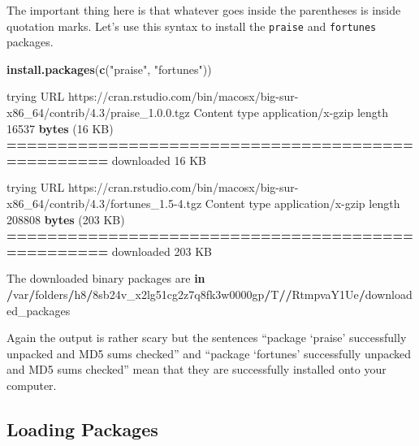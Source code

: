\documentclass[
]{book}
\newenvironment{Shaded}{\begin{snugshade}}{\end{snugshade}}
\newcommand{\ControlFlowTok}[1]{\textcolor[rgb]{0.13,0.29,0.53}{\textbf{#1}}}
\newcommand{\DecValTok}[1]{\textcolor[rgb]{0.00,0.00,0.81}{#1}}
\newcommand{\ErrorTok}[1]{\textcolor[rgb]{0.64,0.00,0.00}{\textbf{#1}}}
\newcommand{\FunctionTok}[1]{\textcolor[rgb]{0.13,0.29,0.53}{\textbf{#1}}}
\newcommand{\NormalTok}[1]{#1}
\newcommand{\SpecialCharTok}[1]{\textcolor[rgb]{0.81,0.36,0.00}{\textbf{#1}}}
\newcommand{\StringTok}[1]{\textcolor[rgb]{0.31,0.60,0.02}{#1}}
\begin{document}
The important thing here is that whatever goes inside the parentheses is inside quotation marks. Let's use this syntax to install the \texttt{praise} and \texttt{fortunes} packages.

\begin{Shaded}
\begin{Highlighting}[]
\FunctionTok{install.packages}\NormalTok{(}\FunctionTok{c}\NormalTok{(}\StringTok{"praise"}\NormalTok{, }\StringTok{"fortunes"}\NormalTok{))}


\NormalTok{trying URL }\StringTok{\textquotesingle{}https://cran.rstudio.com/bin/macosx/big{-}sur{-}x86\_64/contrib/4.3/praise\_1.0.0.tgz\textquotesingle{}}
\NormalTok{Content type }\StringTok{\textquotesingle{}application/x{-}gzip\textquotesingle{}}\NormalTok{ length }\DecValTok{16537} \FunctionTok{bytes}\NormalTok{ (}\DecValTok{16}\NormalTok{ KB)}
\SpecialCharTok{==}\ErrorTok{================================================}
\NormalTok{downloaded }\DecValTok{16}\NormalTok{ KB}

\NormalTok{trying URL }\StringTok{\textquotesingle{}https://cran.rstudio.com/bin/macosx/big{-}sur{-}x86\_64/contrib/4.3/fortunes\_1.5{-}4.tgz\textquotesingle{}}
\NormalTok{Content type }\StringTok{\textquotesingle{}application/x{-}gzip\textquotesingle{}}\NormalTok{ length }\DecValTok{208808} \FunctionTok{bytes}\NormalTok{ (}\DecValTok{203}\NormalTok{ KB)}
\SpecialCharTok{==}\ErrorTok{================================================}
\NormalTok{downloaded }\DecValTok{203}\NormalTok{ KB}


\NormalTok{The downloaded binary packages are }\ControlFlowTok{in}
    \SpecialCharTok{/}\NormalTok{var}\SpecialCharTok{/}\NormalTok{folders}\SpecialCharTok{/}\NormalTok{h8}\SpecialCharTok{/}\NormalTok{8sb24v\_x2lg51cg2z7q8fk3w0000gp}\SpecialCharTok{/}\NormalTok{T}\SpecialCharTok{/}\ErrorTok{/}\NormalTok{RtmpvaY1Ue}\SpecialCharTok{/}\NormalTok{downloaded\_packages}
\end{Highlighting}
\end{Shaded}

Again the output is rather scary but the sentences ``package `praise' successfully unpacked and MD5 sums checked'' and ``package `fortunes' successfully unpacked and MD5 sums checked'' mean that they are successfully installed onto your computer.

\hypertarget{loading-packages}{%
\subsection{Loading Packages}\label{loading-packages}}
\end{document}

